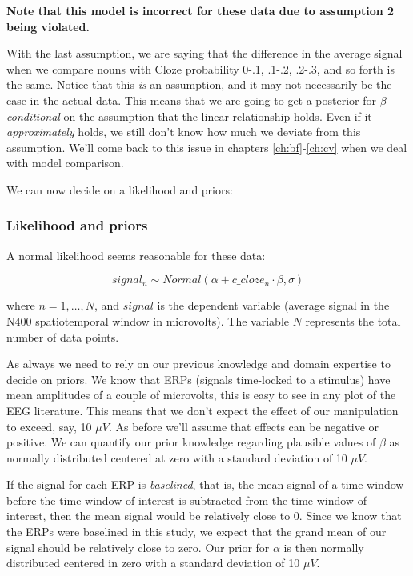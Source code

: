 \documentclass[12pt,]{krantz}
\theoremstyle{definition}
\theoremstyle{definition}
\theoremstyle{definition}
\theoremstyle{remark}
\begin{document}
\textbf{Note that this model is incorrect for these data due to
assumption 2 being violated.}

With the last assumption, we are saying that the difference in the
average signal when we compare nouns with Cloze probability 0-.1, .1-.2,
.2-.3, and so forth is the same. Notice that this \emph{is} an
assumption, and it may not necessarily be the case in the actual data.
This means that we are going to get a posterior for \(\beta\)
\emph{conditional} on the assumption that the linear relationship holds.
Even if it \emph{approximately} holds, we still don't know how much we
deviate from this assumption. We'll come back to this issue in chapters
\ref{ch:bf}-\ref{ch:cv} when we deal with model comparison.

We can now decide on a likelihood and priors:

\subsubsection{Likelihood and priors}\label{likelihood-and-priors-1}

A normal likelihood seems reasonable for these data:

\begin{equation}
   signal_n \sim Normal( \alpha + c\_cloze_n \cdot \beta,\sigma)
  \label{eq:Mcp}
 \end{equation}

where \(n =1, \ldots, N\), and \(signal\) is the dependent variable
(average signal in the N400 spatiotemporal window in microvolts). The
variable \(N\) represents the total number of data points.

As always we need to rely on our previous knowledge and domain expertise
to decide on priors. We know that ERPs (signals time-locked to a
stimulus) have mean amplitudes of a couple of microvolts, this is easy
to see in any plot of the EEG literature. This means that we don't
expect the effect of our manipulation to exceed, say, 10 \(\mu V\). As
before we'll assume that effects can be negative or positive. We can
quantify our prior knowledge regarding plausible values of \(\beta\) as
normally distributed centered at zero with a standard deviation of 10
\(\mu V\).

If the signal for each ERP is \emph{baselined}, that is, the mean signal
of a time window before the time window of interest is subtracted from
the time window of interest, then the mean signal would be relatively
close to 0. Since we know that the ERPs were baselined in this study, we
expect that the grand mean of our signal should be relatively close to
zero. Our prior for \(\alpha\) is then normally distributed centered in
zero with a standard deviation of 10 \(\mu V\).
\end{document}
